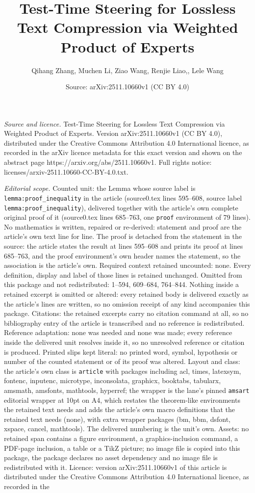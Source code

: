 \documentclass[10pt,a4paper]{amsart}
\title[Test-Time Steering for Lossless Text Compression via Weighte]{Test-Time Steering for Lossless Text Compression via Weighted Product of Experts}
\author{Qihang Zhang, Muchen Li, Ziao Wang, Renjie Liao,, Lele Wang}
\date{Source: arXiv:2511.10660v1 (CC BY 4.0)}
\begin{document}
\maketitle

\noindent\emph{Source and licence.} Test-Time Steering for Lossless Text Compression via Weighted Product of Experts. Version arXiv:2511.10660v1 (CC BY 4.0), distributed under the Creative Commons Attribution 4.0 International licence, as recorded in the arXiv licence metadata for this exact version and shown on the abstract page https://arxiv.org/abs/2511.10660v1. Full rights notice: licenses/arxiv-2511.10660-CC-BY-4.0.txt.\par\smallskip

\noindent\textit{Editorial scope.} Counted unit: the Lemma whose source label is \texttt{lemma:proof\_inequality} in the article (source0.tex lines 595--608, source label \texttt{lemma:proof\_inequality}), delivered together with the article's own complete original proof of it (source0.tex lines 685--763, one \texttt{proof} environment of 79 lines). No mathematics is written, repaired or re-derived: statement and proof are the article's own text line for line. The proof is detached from the statement in the source: the article states the result at lines 595--608 and prints its proof at lines 685--763, and the proof environment's own header names the statement, so the association is the article's own. Required context retained uncounted: none. Every definition, display and label of those lines is retained unchanged. Omitted from this package and not redistributed: 1--594, 609--684, 764--844. Nothing inside a retained excerpt is omitted or altered: every retained body is delivered exactly as the article's lines are written, so no omission receipt of any kind accompanies this package. Citations: the retained excerpts carry no citation command at all, so no bibliography entry of the article is transcribed and no reference is redistributed. Reference adaptation: none was needed and none was made; every reference inside the delivered unit resolves inside it, so no unresolved reference or citation is produced. Printed slips kept literal: no printed word, symbol, hypothesis or number of the counted statement or of its proof was altered. Layout and class: the article's own class is \texttt{article} with packages including acl, times, latexsym, fontenc, inputenc, microtype, inconsolata, graphicx, booktabs, tabularx, amsmath, amsfonts, mathtools, hyperref; the wrapper is the lane's pinned \texttt{amsart} editorial wrapper at 10pt on A4, which restates the theorem-like environments the retained text needs and adds the article's own macro definitions that the retained text needs (none), with extra wrapper packages (bm, bbm, dsfont, xspace, cancel, mathtools). The delivered numbering is the unit's own. Assets: no retained span contains a figure environment, a graphics-inclusion command, a PDF-page inclusion, a table or a TikZ picture; no image file is copied into this package, the package declares no asset dependency and no image file is redistributed with it. Licence: version arXiv:2511.10660v1 of this article is distributed under the Creative Commons Attribution 4.0 International licence, as recorded in the 
\end{document}
